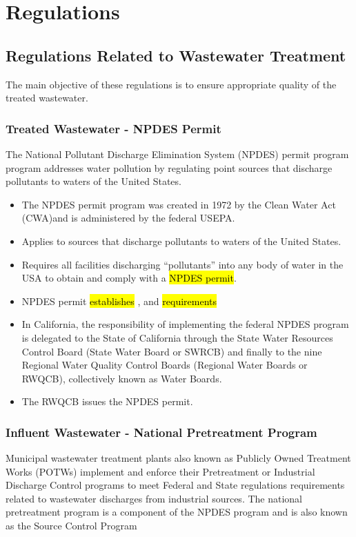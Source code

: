 \chapter{Regulations}
\section{Regulations Related to Wastewater Treatment}
The main objective of these regulations is to ensure appropriate quality of the treated wastewater.  

\subsection{Treated Wastewater - NPDES Permit}
The National Pollutant Discharge Elimination System (NPDES) permit program program addresses water pollution by regulating point sources that discharge pollutants to waters of the United States.

\begin{itemize}
\item The NPDES permit program was created in 1972 by the Clean Water Act (CWA)and is administered by the federal USEPA.
\item Applies to sources that discharge pollutants to waters of the United States.
\item Requires all facilities discharging “pollutants” into any body of water in the USA to obtain and comply with a \hl{NPDES permit}.
\item NPDES permit \hl{establishes} ,  and  \hl{requirements}\\
\item In California, the responsibility of implementing the federal NPDES program is delegated to the State of California through the State Water Resources Control Board (State Water Board or SWRCB) and finally to the nine Regional Water Quality Control Boards (Regional Water Boards or RWQCB), collectively known as Water Boards. 
\item The RWQCB issues the NPDES permit.
\end{itemize}

\subsection{Influent Wastewater - National Pretreatment Program}
Municipal wastewater treatment plants also known as Publicly Owned Treatment Works (POTWs) implement and enforce their Pretreatment or Industrial Discharge Control programs to meet Federal and State regulations requirements related to wastewater discharges from industrial sources.  The national pretreatment program is a component of the NPDES program and is also known as the Source Control Program\\


